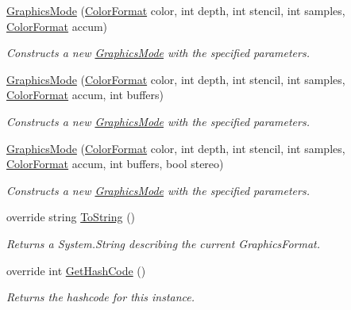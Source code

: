 \begin{DoxyCompactItemize}
\hyperlink{class_open_t_k_1_1_graphics_1_1_graphics_mode_a009ffca43d82cb589019e3ac35df3542}{Graphics\-Mode} (\hyperlink{struct_open_t_k_1_1_graphics_1_1_color_format}{Color\-Format} color, int depth, int stencil, int samples, \hyperlink{struct_open_t_k_1_1_graphics_1_1_color_format}{Color\-Format} accum)
\begin{DoxyCompactList}\small\item\em Constructs a new \hyperlink{class_open_t_k_1_1_graphics_1_1_graphics_mode}{Graphics\-Mode} with the specified parameters.\end{DoxyCompactList}\item 
\hyperlink{class_open_t_k_1_1_graphics_1_1_graphics_mode_a3f68377c73007c7b36982c89e3a1d703}{Graphics\-Mode} (\hyperlink{struct_open_t_k_1_1_graphics_1_1_color_format}{Color\-Format} color, int depth, int stencil, int samples, \hyperlink{struct_open_t_k_1_1_graphics_1_1_color_format}{Color\-Format} accum, int buffers)
\begin{DoxyCompactList}\small\item\em Constructs a new \hyperlink{class_open_t_k_1_1_graphics_1_1_graphics_mode}{Graphics\-Mode} with the specified parameters.\end{DoxyCompactList}\item 
\hyperlink{class_open_t_k_1_1_graphics_1_1_graphics_mode_a8a16c4c08a2dda0f63d805b3deff2c70}{Graphics\-Mode} (\hyperlink{struct_open_t_k_1_1_graphics_1_1_color_format}{Color\-Format} color, int depth, int stencil, int samples, \hyperlink{struct_open_t_k_1_1_graphics_1_1_color_format}{Color\-Format} accum, int buffers, bool stereo)
\begin{DoxyCompactList}\small\item\em Constructs a new \hyperlink{class_open_t_k_1_1_graphics_1_1_graphics_mode}{Graphics\-Mode} with the specified parameters.\end{DoxyCompactList}\item 
override string \hyperlink{class_open_t_k_1_1_graphics_1_1_graphics_mode_a2bfa03969d3afb7da3695c859cf064f8}{To\-String} ()
\begin{DoxyCompactList}\small\item\em Returns a System.\-String describing the current Graphics\-Format.\end{DoxyCompactList}\item 
override int \hyperlink{class_open_t_k_1_1_graphics_1_1_graphics_mode_aad2a94152bb9f576858c17a7428bfad4}{Get\-Hash\-Code} ()
\begin{DoxyCompactList}\small\item\em Returns the hashcode for this instance. \end{DoxyCompactList}\item 

\end{DoxyCompactItemize}
